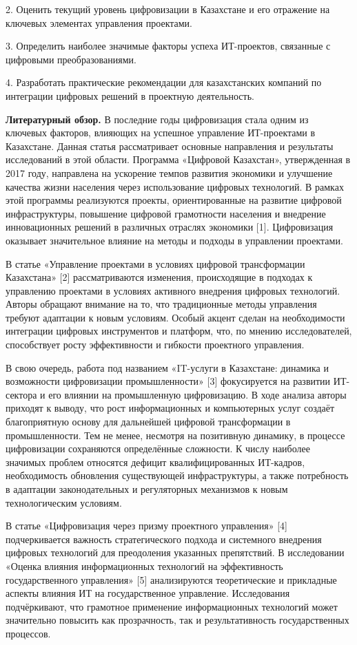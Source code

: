 \begin{multicols}{2}
2. Оценить текущий уровень цифровизации в Казахстане и его отражение на
ключевых элементах управления проектами.

3. Определить наиболее значимые факторы успеха ИТ-проектов, связанные с
цифровыми преобразованиями.

4. Разработать практические рекомендации для казахстанских компаний по
интеграции цифровых решений в проектную деятельность.

{\bfseries Литературный обзор.} В последние годы цифровизация стала одним
из ключевых факторов, влияющих на успешное управление ИТ-проектами в
Казахстане. Данная статья рассматривает основные направления и
результаты исследований в этой области. Программа «Цифровой Казахстан»,
утвержденная в 2017 году, направлена на ускорение темпов развития
экономики и улучшение качества жизни населения через использование
цифровых технологий. В рамках этой программы реализуются проекты,
ориентированные на развитие цифровой инфраструктуры, повышение цифровой
грамотности населения и внедрение инновационных решений в различных
отраслях экономики {[}1{]}. Цифровизация оказывает значительное влияние
на методы и подходы в управлении проектами.

В статье «Управление проектами в условиях цифровой трансформации
Казахстана» {[}2{]} рассматриваются изменения, происходящие в подходах к
управлению проектами в условиях активного внедрения цифровых технологий.
Авторы обращают внимание на то, что традиционные методы управления
требуют адаптации к новым условиям. Особый акцент сделан на
необходимости интеграции цифровых инструментов и платформ, что, по
мнению исследователей, способствует росту эффективности и гибкости
проектного управления.

В свою очередь, работа под названием «IT-услуги в Казахстане: динамика и
возможности цифровизации промышленности» {[}3{]} фокусируется на
развитии ИТ-сектора и его влиянии на промышленную цифровизацию. В ходе
анализа авторы приходят к выводу, что рост информационных и компьютерных
услуг создаёт благоприятную основу для дальнейшей цифровой трансформации
в промышленности. Тем не менее, несмотря на позитивную динамику, в
процессе цифровизации сохраняются определённые сложности. К числу
наиболее значимых проблем относятся дефицит квалифицированных ИТ-кадров,
необходимость обновления существующей инфраструктуры, а также
потребность в адаптации законодательных и регуляторных механизмов к
новым технологическим условиям.

В статье «Цифровизация через призму проектного управления» {[}4{]}
подчеркивается важность стратегического подхода и системного внедрения
цифровых технологий для преодоления указанных препятствий. В
исследовании «Оценка влияния информационных технологий на эффективность
государственного управления» {[}5{]} анализируются теоретические и
прикладные аспекты влияния ИТ на государственное управление.
Исследования подчёркивают, что грамотное применение информационных
технологий может значительно повысить как прозрачность, так и
результативность государственных процессов.


\end{multicols}
